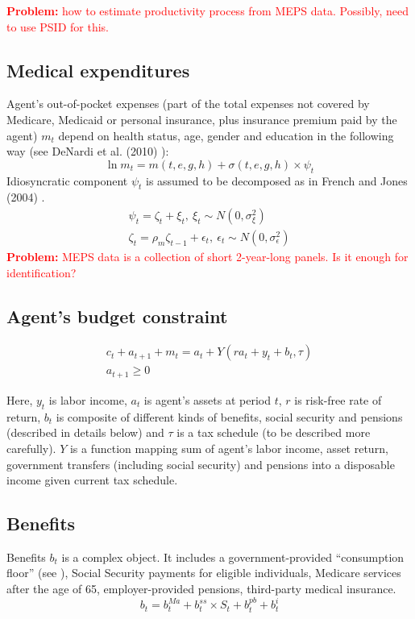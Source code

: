 \documentclass[
10pt, %
a4paper, %
oneside, %
headinclude,footinclude, %
BCOR5mm, %
]{scrartcl}
\begin{document}
 \textcolor{red}{\textbf{Problem:} how to estimate productivity process from MEPS data. Possibly, need to use PSID for this.}

\subsection{Medical expenditures}
Agent's out-of-pocket expenses (part of the total expenses not covered by Medicare, Medicaid or personal insurance, plus insurance premium paid by the agent) $m_t$ depend on health status, age, gender and education in the following way (see DeNardi et al. (2010) \cite{DeNardi2010}):
\begin{equation*}
\ln m_t = m(t,e,g,h) + \sigma(t,e,g,h)\times \psi_t 
\end{equation*}
Idiosyncratic component $\psi_t$ is assumed to be decomposed as in French and Jones (2004) \cite{French2004}.
\begin{eqnarray*}
\psi_t = \zeta_t + \xi_t, \   	\xi_t \sim N(0,\sigma_\xi^2) \\
\zeta_t = \rho_m\zeta_{t-1} + \epsilon_t, \   \epsilon_t \sim N(0,\sigma_\epsilon^2)
\end{eqnarray*}
 \textcolor{red}{\textbf{Problem:} MEPS data is a collection of short 2-year-long panels. Is it enough for identification?}

\subsection{Agent's budget constraint}

\begin{eqnarray*}
c_t + a_{t+1} +m_t = a_t+Y(ra_t+y_t+b_t,\tau)  \\
a_{t+1}\ge0
\end{eqnarray*}

Here, $y_t$ is labor income, $a_t$ is agent's assets at period $t$, $r$ is risk-free rate of return, $b_t$ is composite of different kinds of benefits, social security and pensions (described in details below) and $\tau$ is a tax schedule (to be described more carefully).  $Y$ is a function mapping sum of agent's labor income, asset return, government transfers (including social security) and pensions into a disposable income given current tax schedule.

\subsection{Benefits}
Benefits $b_t$ is a complex object. It includes a government-provided ``consumption floor'' (see \cite{DeNardi2010}), Social Security payments for eligible individuals, Medicare services after the age of 65, employer-provided pensions, third-party medical insurance.
\begin{equation*}
b_t = b_t^{Ma} + b_t^{ss}\times S_t+b_t^{pb}+b_t^{i}
\end{equation*}
\end{document}
